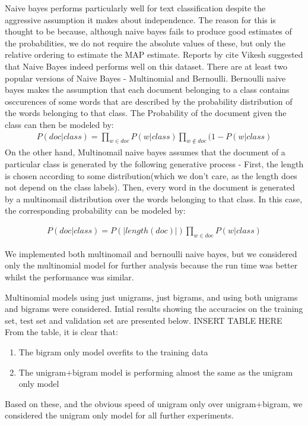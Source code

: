 \documentclass{sig-alternate-05-2015}
\begin{document}
Naive bayes performs particularly well for text classification despite the aggressive assumption it makes about independence.  The reason for this is thought to be because, although naive bayes fails to produce good estimates of the probabilities, we do not require the absolute values of these, but only the relative ordering to estimate the MAP estimate. Reports by cite Vikesh suggested that Naive Bayes indeed performs well on this dataset. There are at least two popular versions of Naive Bayes - Multinomial and Bernoulli. 
Bernoulli naive bayes makes the assumption that each document belonging to a class contains osccurences of some words that are described by the probability distribution of the words belonging to that class. The  Probability of the document given the class can then be modeled by:
\begin{align*}
P(doc|class) = \prod_{w \in doc}P(w|class) \prod_{w\not\in doc}(1-P(w|class)
\end{align*}
On the other hand, Multinomail naive bayes assumes that the document of a particular class is generated by the following generative process - First, the length is chosen according to some distribution(which we don't care, as the length does not depend on the class labels). Then, every word in the document is generated by a multinomail distribution over the words belonging to that class. In this case, the corresponding probability can be modeled by:

\begin{align*}
P(doc|class) = P(|length(doc)|)\prod_{w \in doc}P(w|class)
\end{align*}

We implemented both multinomail and bernoulli naive bayes, but we considered only the multinomial model for further analysis because the run time was better whilst the performance was similar.

Multinomial models using just unigrams, just bigrams, and using both unigrams and bigrams were considered. Intial results showing the accuracies on the training set, test set and validation set are presented below. 
INSERT TABLE HERE
From the table, it is clear that:
\begin{enumerate}
\item The bigram only model overfits to the training data
\item The unigram+bigram model is performing almost the same as the unigram only model
\end{enumerate}
Based on these, and the obvious speed of unigram only over unigram+bigram, we considered the unigram only model for all further experiments. 
\end{document}
